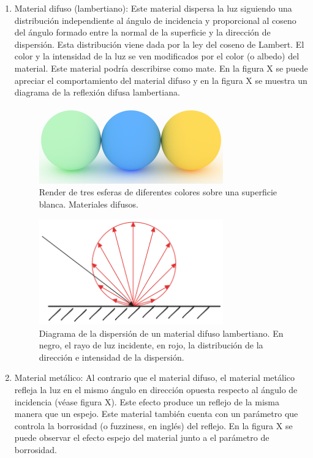 \documentclass[10pt, a4paper]{article}
\begin{document}
\begin{enumerate}
    
\item Material difuso (lambertiano): Este material dispersa la luz siguiendo una distribución independiente al ángulo de incidencia y proporcional al coseno del ángulo formado entre la normal de la superficie y la dirección de dispersión. Esta distribución viene dada por la ley del coseno de Lambert. El color y la intensidad de la luz se ven modificados por el color (o albedo) del material. Este material podría describirse como mate. En la figura X se puede apreciar el comportamiento del material difuso y en la figura X se muestra un diagrama de la reflexión difusa lambertiana.

\begin{figure}[h]
     \centering 
    \includegraphics[width=0.75\textwidth]{02_crop}

    \caption{Render de tres esferas de diferentes colores sobre una superficie blanca. Materiales difusos.}
\end{figure}

\begin{figure}[h]
     \centering 
    \includegraphics[width=0.75\textwidth]{lambertian}

    \caption{Diagrama de la dispersión de un material difuso lambertiano. En negro, el rayo de luz incidente, en rojo, la distribución de la dirección e intensidad de la dispersión.}
\end{figure}

\item Material metálico: Al contrario que el material difuso, el material metálico refleja la luz en el mismo ángulo en dirección opuesta respecto al ángulo de incidencia (véase figura X). Este efecto produce un reflejo de la misma manera que un espejo. Este material también cuenta con un parámetro que controla la borrosidad (o fuzziness, en inglés) del reflejo. En la figura X se puede observar el efecto espejo del material junto a el parámetro de borrosidad.


\end{enumerate}
\end{document}
